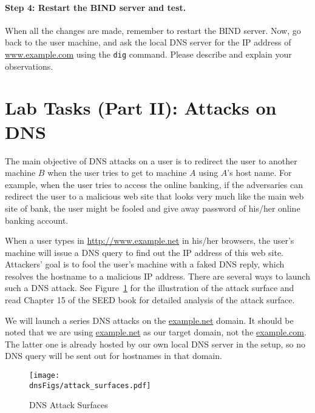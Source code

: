 \paragraph{Step 4: Restart the BIND server and test.}
When all the changes are made, remember to restart the BIND server.
Now, go back to the user machine, and 
ask  the local DNS server for the IP address of
\url{www.example.com} using the \texttt{dig} command. Please 
describe and explain your observations. 






\section{Lab Tasks (Part II): Attacks on DNS}


The main objective of DNS attacks on a user is to redirect the user
to another machine $B$ when the user tries to get to machine $A$ using
$A$'s host name. For example, when the user tries to access the online banking,
if the adversaries can redirect the user 
to a malicious web site that looks very much like the main web site 
of bank, the user might be fooled and give away password
of his/her online banking account.

When a user types in \url{http://www.example.net} 
in his/her browsers, the user's machine will issue
a DNS query to find out the IP address of this web site. Attackers' goal
is to fool the user's machine with a faked DNS reply, which resolves
the hostname to a malicious IP address. There are several ways to launch such 
a DNS attack. See Figure~\ref{dns:fig:attack_surface} for the illustration 
of the attack surface and read Chapter 15 of the SEED book for detailed 
analysis of the attack surface. 

We will launch a series DNS attacks on the \url{example.net} domain.  
It should be noted that we are using \url{example.net} as our target domain, not 
the \url{example.com}. The latter one is already hosted by our own
local DNS server in the setup, so no DNS query will be 
sent out for hostnames in that domain.



\begin{figure}[tb]
\centering
\texttt{[image: \\dnsFigs/attack\_surfaces.pdf]}
\caption{DNS Attack Surfaces}
\label{dns:fig:attack_surface}
\end{figure}



